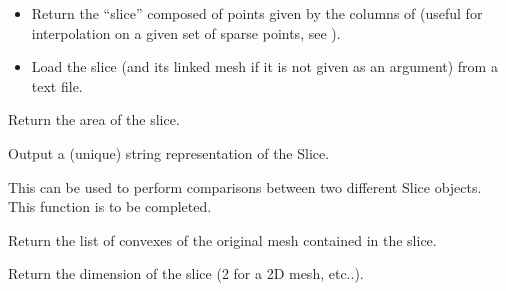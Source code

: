 \documentclass[a4paper,11pt,english]{sphinxmanual}
\begin{document}
\begin{fulllineitems}
\begin{itemize}
\item {} 
Return the “slice” composed of points given by the columns of 
(useful for interpolation on a given set of sparse points, see
).

\item {} 
Load the slice (and its linked mesh if it is not given as an argument)
from a text file.

\end{itemize}

\begin{fulllineitems}
\label{\detokenize{python/cmdref_Slice:getfem.Slice.area}}
Return the area of the slice.

\end{fulllineitems}


\begin{fulllineitems}
\label{\detokenize{python/cmdref_Slice:getfem.Slice.char}}
Output a (unique) string representation of the Slice.

This can be used to perform comparisons between two
different Slice objects.
This function is to be completed.

\end{fulllineitems}


\begin{fulllineitems}
\label{\detokenize{python/cmdref_Slice:getfem.Slice.cvs}}
Return the list of convexes of the original mesh contained in the slice.

\end{fulllineitems}


\begin{fulllineitems}
\label{\detokenize{python/cmdref_Slice:getfem.Slice.dim}}
Return the dimension of the slice (2 for a 2D mesh, etc..).


\end{fulllineitems}
\end{fulllineitems}
\end{document}
